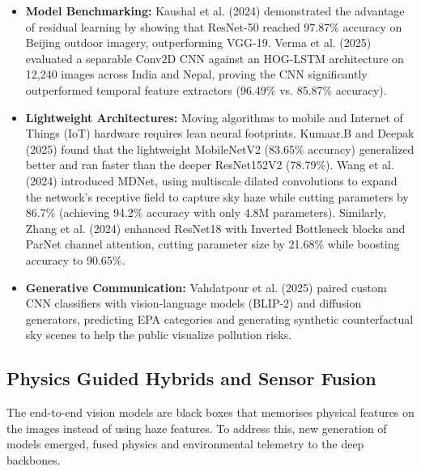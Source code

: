 \documentclass[conference]{IEEEtran}
\begin{document}
\begin{itemize}
  \item \textbf{Model Benchmarking:} Kaushal et al.
        (2024)\cite{kaushalEvaluationDeepLearning2024} demonstrated the
        advantage of residual learning by showing that ResNet-50 reached 97.87\%
        accuracy on Beijing outdoor imagery, outperforming VGG-19. Verma et al.
        (2025)\cite{vermaImagebasedAirPollution2025} evaluated a separable
        Conv2D CNN against an HOG-LSTM architecture on 12,240 images across
        India and Nepal, proving the CNN significantly outperformed temporal
        feature extractors (96.49\% vs. 85.87\% accuracy).
  \item \textbf{Lightweight Architectures:} Moving algorithms to mobile and
        Internet of Things (IoT) hardware requires lean neural footprints.
        Kumaar.B and Deepak (2025)\cite{kumaar.bImageBasedAir2025} found that
        the lightweight MobileNetV2 (83.65\% accuracy) generalized better and
        ran faster than the deeper ResNet152V2 (78.79\%). Wang et al.
        (2024)\cite{wangLightweightAirQuality2024} introduced MDNet, using
        multiscale dilated convolutions to expand the network's receptive field
        to capture sky haze while cutting parameters by 86.7\% (achieving 94.2\%
        accuracy with only 4.8M parameters). Similarly, Zhang et al.
        (2024)\cite{zhangAirQualityLevel2024} enhanced ResNet18 with Inverted
        Bottleneck blocks and ParNet channel attention, cutting parameter size
        by 21.68\% while boosting accuracy to 90.65\%.
  \item \textbf{Generative Communication:} Vahdatpour et al.
        (2025)\cite{vahdatpourForecastingVisualizingAir2025} paired custom CNN
        classifiers with vision-language models (BLIP-2) and diffusion
        generators, predicting EPA categories and generating synthetic
        counterfactual sky scenes to help the public visualize pollution risks.
\end{itemize}

\subsection{Physics Guided Hybrids and Sensor Fusion}

The end-to-end vision models are black boxes that memorises physical features on
the images instead of using haze features. To address this, new generation of
models emerged, fused physics and environmental telemetry to the deep backbones.
\end{document}
